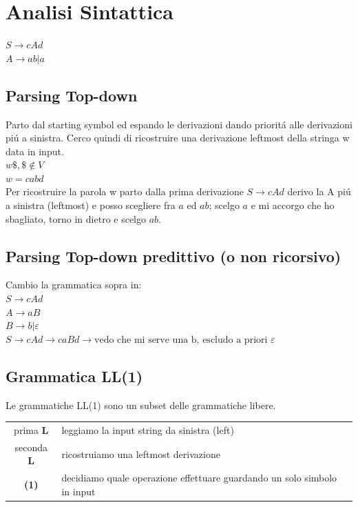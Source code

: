 \chapter{Analisi Sintattica}
$S \rightarrow cAd$\\
$A \rightarrow ab | a$\\

\section{Parsing Top-down}
Parto dal starting symbol ed espando le derivazioni dando priorit\'a alle derivazioni pi\'u a sinistra.
Cerco quindi di ricostruire una derivazione leftmost della stringa w data in input.\\[5pt]
$w\$, \$ \not\in V$\\
$w=cabd$\\[5pt]
Per ricostruire la parola w parto dalla prima derivazione $S \rightarrow cAd$ derivo la A pi\'u a sinistra (leftmost) e posso scegliere 
fra $a$ ed $ab$; scelgo $a$ e mi accorgo che ho sbagliato, torno in dietro e scelgo $ab$.

\section{Parsing Top-down predittivo (o non ricorsivo)}
Cambio la grammatica sopra in: \\
$S \rightarrow cAd$\\
$A \rightarrow aB$\\
$B \rightarrow b | \varepsilon $\\[5pt]
$S \rightarrow cAd \rightarrow caBd \rightarrow \text{vedo che mi serve una b, escludo a priori } \varepsilon$\\ 

\section{Grammatica LL(1)}
Le grammatiche LL(1) sono un subset delle grammatiche libere.\\
\begin{tabular}{cl}
    prima \textbf{L}    & leggiamo la input string da sinistra (left)\\
    seconda \textbf{L}  & ricostruiamo una leftmost derivazione\\
    \textbf{(1)}        & decidiamo quale operazione effettuare guardando un solo simbolo in input\\
\end{tabular}

